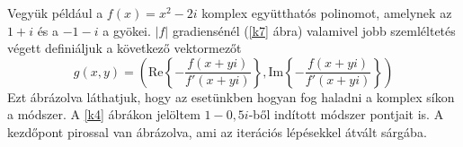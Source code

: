 \documentclass[a4paper,12pt]{report}
\begin{document}
			Vegyük például a $f(x)=x^2-2i$ komplex együtthatós polinomot, amelynek az $1+i$ és a $-1-i$ a gyökei. $|f|$ gradiensénél (\ref{k7} ábra) valamivel jobb szemléltetés végett definiáljuk a következő vektormezőt
			\[g(x,y)=\left(\mathrm{Re} \left\{ -\frac{f(x+yi)}{f'(x+yi)} \right \} ,\mathrm{Im} \left\{-\frac{f(x+yi)}{f'(x+yi)}\right \} \right)\]
			Ezt ábrázolva láthatjuk, hogy az esetünkben hogyan fog haladni a komplex síkon a módszer. A \ref{k4} ábrákon jelöltem $1-0,\!5i$-ből indított módszer pontjait is. A kezdőpont pirossal van ábrázolva, ami az iterációs lépésekkel átvált sárgába.
			
			\begin{figure}[ht]
				\hfill

\end{figure}
\end{document}
